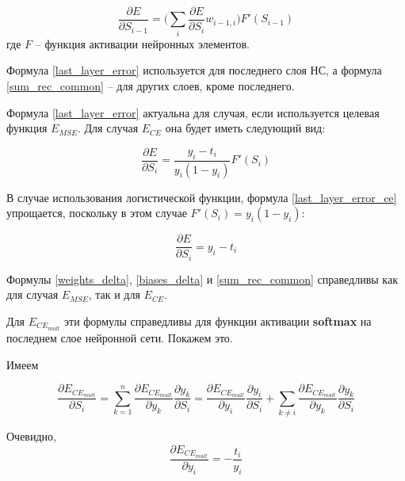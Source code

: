 \begin{equation}
	\label{sum_rec_common}
	\frac{\partial E}{\partial S_{i-1}} = \Bigg(\sum_{i}\frac{\partial E}{\partial S_i}w_{i-1, i}\Bigg)F'(S_{i-1})
\end{equation}
где $F$ -- функция активации нейронных элементов.

Формула \ref{last_layer_error} используется для последнего слоя НС, а формула \ref{sum_rec_common} -- для других слоев, кроме последнего.

Формула \ref{last_layer_error} актуальна для случая, если используется целевая функция $E_{MSE}$. Для случая $E_{CE}$ она будет иметь следующий вид:

\begin{equation}
	\label{last_layer_error_ce}
	\frac{\partial E}{\partial S_i} = \frac{y_i - t_i}{y_i(1-y_i)}F'(S_i)
\end{equation}

В случае использования логистической функции, формула \ref{last_layer_error_ce} упрощается, поскольку в этом случае $F'(S_i)=y_i(1-y_i)$:

\begin{equation}
	\frac{\partial E}{\partial S_i} = y_i - t_i
\end{equation}

Формулы \ref{weights_delta}, \ref{biases_delta} и \ref{sum_rec_common} справедливы как для случая $E_{MSE}$, так и для $E_{CE}$.

Для $E_{CE_{mult}}$ эти формулы справедливы для функции активации \textbf{softmax} на последнем слое нейронной сети. Покажем это.

Имеем

\begin{equation}
	\label{common_E}
	\frac{\partial E_{CE_{mult}}}{\partial S_i} = \sum_{k=1}^{n} \frac{\partial E_{CE_{mult}}}{\partial y_k}\frac{\partial y_k}{\partial S_i} = \frac{\partial E_{CE_{mult}}}{\partial y_i}\frac{\partial y_i}{\partial S_i} + \sum_{k\neq i}\frac{\partial E_{CE_{mult}}}{\partial y_k}\frac{\partial y_k}{\partial S_i}
\end{equation}

Очевидно, 
\begin{equation}
\label{part_deriv_y}
\frac{\partial E_{CE_{mult}}}{\partial y_i} = -\frac{t_i}{y_i}
\end{equation}

